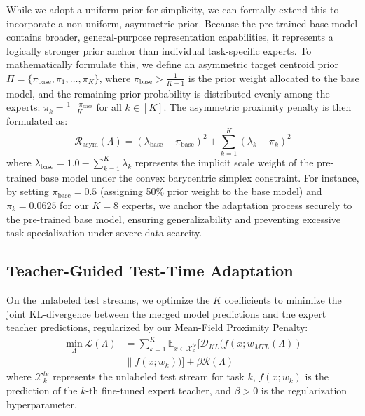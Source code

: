While we adopt a uniform prior for simplicity, we can formally extend this to incorporate a non-uniform, asymmetric prior. Because the pre-trained base model contains broader, general-purpose representation capabilities, it represents a logically stronger prior anchor than individual task-specific experts. To mathematically formulate this, we define an asymmetric target centroid prior $\Pi = \{\pi_{\text{base}}, \pi_1, \dots, \pi_K\}$, where $\pi_{\text{base}} > \frac{1}{K+1}$ is the prior weight allocated to the base model, and the remaining prior probability is distributed evenly among the experts: $\pi_k = \frac{1 - \pi_{\text{base}}}{K}$ for all $k \in [K]$. The asymmetric proximity penalty is then formulated as:
\begin{equation}
    \mathcal{R}_{\text{asym}}(\Lambda) = \left( \lambda_{\text{base}} - \pi_{\text{base}} \right)^2 + \sum_{k=1}^K \left( \lambda_k - \pi_k \right)^2
\end{equation}
where $\lambda_{\text{base}} = 1.0 - \sum_{k=1}^K \lambda_k$ represents the implicit scale weight of the pre-trained base model under the convex barycentric simplex constraint. For instance, by setting $\pi_{\text{base}} = 0.5$ (assigning 50\% prior weight to the base model) and $\pi_k = 0.0625$ for our $K=8$ experts, we anchor the adaptation process securely to the pre-trained base model, ensuring generalizability and preventing excessive task specialization under severe data scarcity.

\subsection{Teacher-Guided Test-Time Adaptation}
On the unlabeled test streams, we optimize the $K$ coefficients to minimize the joint KL-divergence between the merged model predictions and the expert teacher predictions, regularized by our Mean-Field Proximity Penalty:
\begin{equation}
\begin{aligned}
    \min_{\Lambda} \mathcal{L}(\Lambda) &= \sum_{k=1}^K \mathbb{E}_{x \in \mathcal{X}_k^{te}} \Big[ \mathcal{D}_{KL}\Big( f(x; w_{MTL}(\Lambda)) \\
    &\parallel f(x; w_k) \Big) \Big] + \beta \mathcal{R}(\Lambda)
\end{aligned}
\end{equation}
where $\mathcal{X}_k^{te}$ represents the unlabeled test stream for task $k$, $f(x; w_k)$ is the prediction of the $k$-th fine-tuned expert teacher, and $\beta > 0$ is the regularization hyperparameter.

